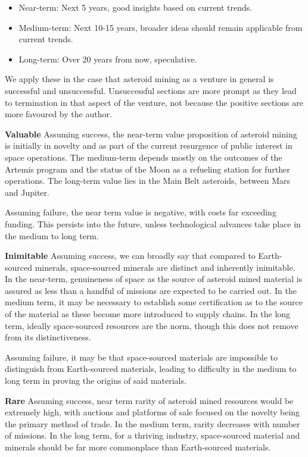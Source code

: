 \documentclass[conference]{IEEEtran}
\begin{document}
\begin{itemize}
    \item Near-term: Next 5 years, good insights based on current trends.
    \item Medium-term: Next 10-15 years, broader ideas should remain applicable from current trends.
    \item Long-term: Over 20 years from now, speculative.
\end{itemize}

We apply these in the case that asteroid mining as a venture in general is successful and unsuccessful. Unsuccessful sections are more prompt as they lead to termination in that aspect of the venture, not because the positive sections are more favoured by the author.

\textbf{Valuable}
Assuming success, the near-term value proposition of asteroid mining is initially in novelty and as part of the current resurgence of public interest in space operations. The medium-term depends mostly on the outcomes of the Artemis program and the status of the Moon as a refueling station for further operations. The long-term value lies in the Main Belt asteroids, between Mars and Jupiter.

Assuming failure, the near term value is negative, with costs far exceeding funding. This persists into the future, unless technological advances take place in the medium to long term.

\textbf{Inimitable}
Assuming success, we can broadly say that compared to Earth-sourced minerals, space-sourced minerals are distinct and inherently inimitable. In the near-term, genuineness of space as the source of asteroid mined material is assured as less than a handful of missions are expected to be carried out. In the medium term, it may be necessary to establish some certification as to the source of the material as these become more introduced to supply chains. In the long term, ideally space-sourced resources are the norm, though this does not remove from its distinctiveness.

Assuming failure, it may be that space-sourced materials are impossible to distinguish from Earth-sourced materials, leading to difficulty in the medium to long term in proving the origins of said materials.

\textbf{Rare}
Assuming success, near term rarity of asteroid mined resources would be extremely high, with auctions and platforms of sale focused on the novelty being the primary method of trade. In the medium term, rarity decreases with number of missions. In the long term, for a thriving industry, space-sourced material and minerals should be far more commonplace than Earth-sourced materials.
\end{document}
